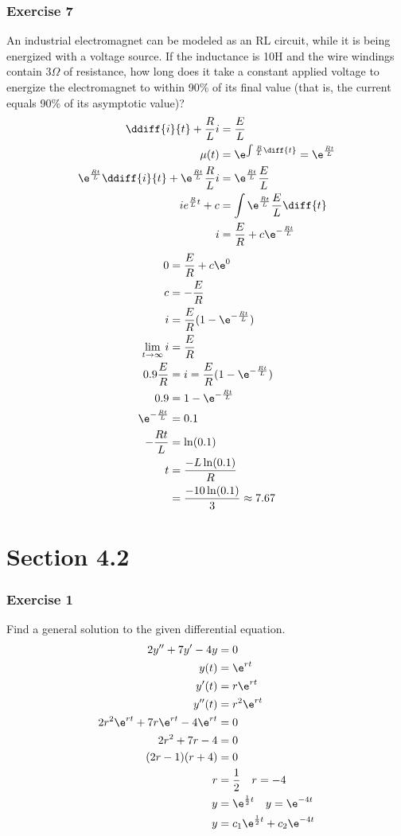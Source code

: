 \documentclass{math}
\begin{document}
\subsubsection*{Exercise 7}
An industrial electromagnet can be modeled as an RL circuit, while it is being
energized with a voltage source. If the inductance is 10H and the wire windings
contain \( 3\Omega \) of resistance, how long does it take a constant applied
voltage to energize the electromagnet to within 90\% of its final value (that
is, the current equals 90\% of its asymptotic value)?
\begin{align*}
  \ddiff{i}{t}+\frac{R}{L}i &= \frac{E}{L} \\
  \mu(t) &= \e^{\int\frac{R}{L}\diff{t}} = \e^{\frac{Rt}{L}} \\
  \e^{\frac{Rt}{L}}\ddiff{i}{t}+\e^{\frac{Rt}{L}}\frac{R}{L}i &=
    \e^{\frac{Rt}{L}}\frac{E}{L} \\
  ie^{\frac{R}{L}t}+c &= \int\e^{\frac{Rt}{L}}\frac{E}{L}\diff{t} \\
  i &= \frac{E}{R}+c\e^{-\frac{Rt}{L}}
\end{align*}
\begin{align*}
  0 &= \frac{E}{R}+c\e^0 \\
  c &= -\frac{E}{R} \\
  i &= \frac{E}{R}(1-\e^{-\frac{Rt}{L}}) \\
  \lim_{t\to\infty}i &= \frac{E}{R} \\
  0.9\frac{E}{R} &= i = \frac{E}{R}(1-\e^{-\frac{Rt}{L}}) \\
  0.9 &= 1-\e^{-\frac{Rt}{L}} \\
  \e^{-\frac{Rt}{L}} &= 0.1 \\
  -\frac{Rt}{L} &= \ln(0.1) \\
  t &= \frac{-L\ln(0.1)}{R} \\
  &= \frac{-10\ln(0.1)}{3} \approx 7.67
\end{align*}

\section*{Section 4.2}

\subsubsection*{Exercise 1}
Find a general solution to the given differential equation.
\begin{align*}
  2y''+7y'-4y &= 0 \\
  y(t) &= \e^{rt} \\
  y'(t) &= r\e^{rt} \\
  y''(t) &= r^2\e^{rt} \\
  2r^2\e^{rt}+7r\e^{rt}-4\e^{rt} &= 0 \\
  2r^2+7r-4 &= 0 \\
  (2r-1)(r+4) &= 0 \\
  r &= \frac{1}{2} \quad r = -4 \\
  y &= \e^{\frac{1}{2}t} \quad y = \e^{-4t} \\
  y &= c_1\e^{\frac{1}{2}t}+c_2\e^{-4t}
\end{align*}
\end{document}
